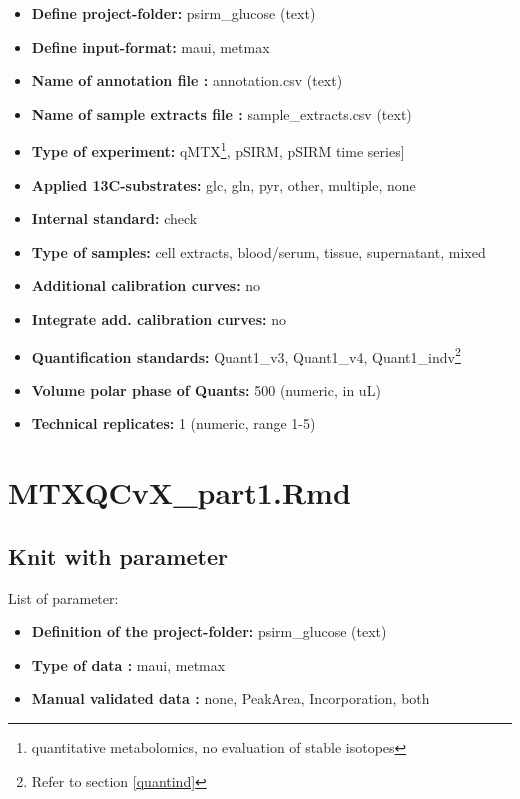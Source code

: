 \documentclass[]{book}
\providecommand{\tightlist}{%
  \setlength{\itemsep}{0pt}\setlength{\parskip}{0pt}}
\let\rmarkdownfootnote\footnote%
\def\footnote{\protect\rmarkdownfootnote}
\theoremstyle{definition}
\theoremstyle{definition}
\theoremstyle{definition}
\theoremstyle{remark}
\begin{document}
\begin{itemize}
\tightlist
\item
  \textbf{Define project-folder:} psirm\_glucose (text)
\item
  \textbf{Define input-format:} maui, metmax
\item
  \textbf{Name of annotation file :} annotation.csv (text)
\item
  \textbf{Name of sample extracts file :} sample\_extracts.csv (text)
\item
  \textbf{Type of experiment:} qMTX\footnote{quantitative metabolomics,
    no evaluation of stable isotopes}, pSIRM, pSIRM time series{]}
\item
  \textbf{Applied 13C-substrates:} glc, gln, pyr, other, multiple, none
\item
  \textbf{Internal standard:} check
\item
  \textbf{Type of samples:} cell extracts, blood/serum, tissue,
  supernatant, mixed
\item
  \textbf{Additional calibration curves:} no
\item
  \textbf{Integrate add. calibration curves:} no
\item
  \textbf{Quantification standards:} Quant1\_v3, Quant1\_v4,
  Quant1\_indv\footnote{Refer to section \ref{quantind}}
\item
  \textbf{Volume polar phase of Quants:} 500 (numeric, in uL)
\item
  \textbf{Technical replicates:} 1 (numeric, range 1-5)
\end{itemize}

\chapter{MTXQCvX\_part1.Rmd}\label{part1}

\section{Knit with parameter}\label{knit-with-parameter-2}

List of parameter:

\begin{itemize}
\tightlist
\item
  \textbf{Definition of the project-folder:} psirm\_glucose (text)
\item
  \textbf{Type of data :} maui, metmax
\item
  \textbf{Manual validated data :} none, PeakArea, Incorporation, both
\end{itemize}
\end{document}
